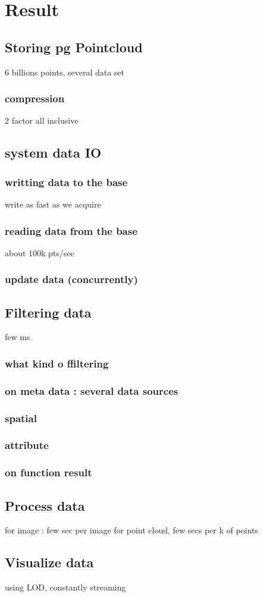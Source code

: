 

 \section{Result}
	\subsection{Storing pg Pointcloud}
 		6 billions points,
 		several data set
 		\subsubsection{compression}
 		2 factor all inclusive
		\subsection{system data IO}
			
			\subsubsection{writting data to the base}
				write as fast as we acquire
			\subsubsection{reading data from the base}
	 			about 100k pts/sec
		\subsubsection{update data (concurrently) }
			
	\subsection{Filtering data } 
		few ms
		\subsubsection{what kind o ffiltering}
		\subsubsection{on meta data : several data sources}
		\subsubsection{spatial}
		\subsubsection{attribute}
		\subsubsection{on function result} 
	\subsection{Process data}
		for image : few sec per image
		for point cloud, few secs per k of points
	\subsection{Visualize data}
		using LOD, constantly streaming
		